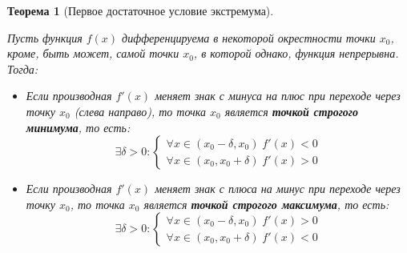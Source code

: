 \documentclass[a4paper,12pt,oneside]{extbook}
\newcommand{\newpar}{$ $\par\nobreak\ignorespaces}
\theoremstyle{numbered}
\theoremstyle{unnumbered}
\theoremstyle{named}
\newtheorem{theorem}{Теорема}[section]
\theoremstyle{unnumbered}
\theoremstyle{named}
\theoremstyle{named}
\theoremstyle{named}
\begin{document}
\begin{theorem}[Первое достаточное условие экстремума]
    \label{theorem:Первое достаточное условие экстремума}
    \newpar
    Пусть функция \(f(x)\) дифференцируема в некоторой окрестности точки \(x_0\), кроме, быть может, самой точки \(x_0\), в которой однако, функция непрерывна. Тогда:
    \begin{itemize}
        \item {
              Если производная \(f'(x)\) меняет знак с минуса на плюс при переходе через точку \(x_0\) (слева направо), то точка \(x_0\) является \textbf{точкой строгого минимума}, то есть:
              \[
                  \exists \delta > 0:
                  \begin{cases}
                      \forall x \in (x_0 - \delta, x_0) \; f'(x) < 0 \\
                      \forall x \in (x_0, x_0 + \delta) \; f'(x) > 0
                  \end{cases}
              \]
              }
              \item{
                          Если производная \(f'(x)\) меняет знак с плюса на минус при переходе через точку \(x_0\), то точка \(x_0\) является \textbf{точкой строгого максимума}, то есть:
                          \[
                              \exists \delta > 0:
                              \begin{cases}
                                  \forall x \in (x_0 - \delta, x_0) \; f'(x) > 0 \\
                                  \forall x \in (x_0, x_0 + \delta) \; f'(x) < 0
                              \end{cases}
                          \]
                    }
    \end{itemize}
\end{theorem}
\end{document}

